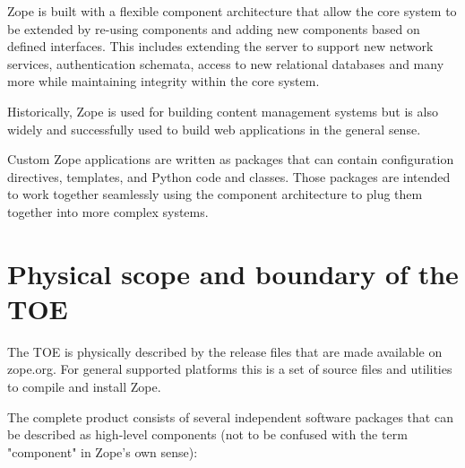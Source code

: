 \documentclass[12pt,english]{scrbook}
\begin{document}
Zope is built with a flexible component architecture that allow the core system
to be extended by re-using components and adding new components based on
defined interfaces. This includes extending the server to support new network
services, authentication schemata, access to new relational databases and many
more while maintaining integrity within the core system.

Historically, Zope is used for building content management systems but is also
widely and successfully used to build web applications in the general sense.

Custom Zope applications are written as packages that can contain configuration
directives, templates, and Python code and classes. Those packages are intended
to work together seamlessly using the component architecture to plug them
together into more complex systems.

\section{Physical scope and boundary of the TOE}

The TOE  is physically described by the release files that are made available
on zope.org. For general supported platforms this is a set of source files and
utilities to compile and install Zope. 

The complete product consists of several independent software packages that
can be described as high-level components (not to be confused with the term
"component" in Zope's own sense):
\end{document}
